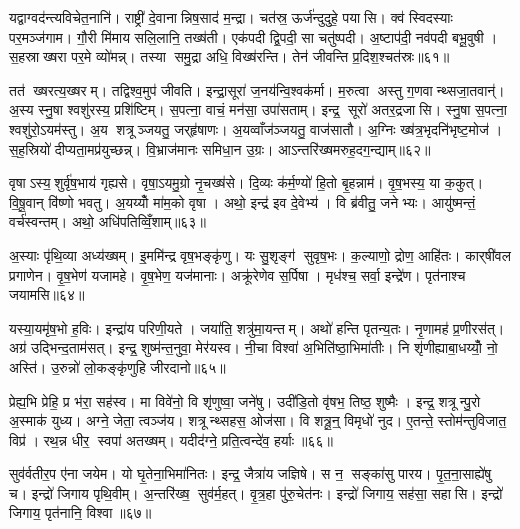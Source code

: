 यद्वाग्वद॑न्त्यविचेत॒नानि॑। राष्ट्री॑ दे॒वानान्निष॒साद॑ म॒न्द्रा। चत॑स्र॒ ऊर्ज॑न्दुदुहे॒ पयासि। क्व॑ स्विदस्याः पर॒मञ्ज॑गाम। गौ॒री मि॑माय सलि॒लानि॒ तख्ष॑ती। एक॑पदी द्वि॒पदी॒ सा चतु॑ष्पदी। अ॒ष्टाप॑दी॒ नव॑पदी बभू॒वुषी। स॒हस्राख्षरा पर॒मे व्यो॑मन्न्। तस्या समु॒द्रा अधि॒ विख्ष॑रन्ति। तेन॑ जीवन्ति प्र॒दिश॒श्चत॑स्रः॥६१॥

तत॑ ख्षरत्य॒ख्षरम्। तद्विश्व॒मुप॑ जीवति। इन्द्रा॒सूरा॑ ज॒नय॑न्वि॒श्वक॑र्मा। म॒रुत्वा अस्तु ग॒णवान्थ्सजा॒तवान्॑। अ॒स्य स्नु॒षा श्वशु॑रस्य॒ प्रशि॑ष्टिम्। स॒पत्ना॒ वाचं॒ मन॑सा॒ उपा॑सताम्। इन्द्र॒ सूरो॑ अतर॒द्रजासि। स्नु॒षा स॒पत्ना॒ श्वशु॑रो॒ऽयम॑स्तु। अ॒य शत्रूञ्जयतु॒ जर्‌हृ॑षाणः। अ॒यव्वाँज॑ञ्जयतु॒ वाज॑सातौ। अ॒ग्निः ख्ष॑त्र॒भृदनि॑भृष्ट॒मोज॑। स॒ह॒स्रियो॑ दीप्यता॒मप्र॑युच्छन्न्। वि॒भ्राज॑मानः समिधा॒न उ॒ग्रः। आऽन्तरि॑ख्षमरुह॒दग॒न्द्याम्॥६२॥\anuvakamend[धा॒रय॑न्पुरो॒डाशं॒ बृह॒स्पति॑ञ्ज॒घन॑च्युतिमान॒न्दो भग॑स्य तृप्याण्य॒ग्नेः पृ॑थि॒वी यज्व॑न एतु प्र॒दिश॒श्चत॑स्रो॒ वाज॑सातौ च॒त्वारि॑ च]

वृषाऽस्य॒शुर्वृ॑ष॒भाय॑ गृह्यसे। वृषा॒ऽयमु॒ग्रो नृ॒चख्ष॑से। दि॒व्यः क॑र्म॒ण्यो॑ हि॒तो बृ॒हन्नाम॑। वृ॒ष॒भस्य॒ या क॒कुत्। वि॒षू॒वान् वि॑ष्णो भवतु। अ॒यय्योँ मा॑म॒को वृषा। अथो॒ इन्द्र॑ इव दे॒वेभ्य॑। वि ब्र॑वीतु॒ जनेभ्यः। आयु॑ष्मन्तं॒ वर्च॑स्वन्तम्। अथो॒ अधि॑पतिव्विँ॒शाम्॥६३॥

अ॒स्याः पृ॑थि॒व्या अध्य॑ख्षम्। इ॒ममि॑न्द्र वृष॒भङ्कृ॑णु। यः सु॒शृङ्ग॑ सुवृष॒भः। क॒ल्याणो॒ द्रोण॒ आहि॑तः। कार्‌षी॑वल प्रगाणेन। वृ॒ष॒भेण॑ यजामहे। वृ॒ष॒भेण॒ यज॑मानाः। अक्रू॑रेणेव स॒र्पिषा। मृध॑श्च॒ सर्वा॒ इन्द्रे॑ण। पृत॑नाश्च जयामसि॥६४॥

यस्या॒यमृ॑ष॒भो ह॒विः। इन्द्रा॑य परिणी॒यते। जया॑ति॒ शत्रु॑मा॒यन्तम्। अथो॑ हन्ति पृतन्य॒तः। नृ॒णामह॑ प्र॒णीरस॑त्। अग्र॑ उद्भिन्द॒ताम॑सत्। इन्द्र॒ शुष्म॑न्त॒नुवा॒ मेर॑यस्व। नी॒चा विश्वा॑ अ॒भिति॑ष्ठा॒भिमा॑तीः। नि शृ॑णीह्याबा॒धय्योँ॒ नो॒ अस्ति॑। उ॒रुन्नो॑ लो॒कङ्कृ॑णुहि जीरदानो॥६५॥

प्रेह्य॒भि प्रेहि॒ प्र भ॑रा॒ सह॑स्व। मा विवे॑नो॒ वि शृ॑णुष्वा॒ जने॑षु। उदी॑डि॒तो वृ॑षभ॒ तिष्ठ॒ शुष्मैः। इन्द्र॒ शत्रून्पु॒रो अ॒स्माक॑ युध्य। अग्ने॒ जेता॒ त्वञ्ज॑य। शत्रून्थ्सहस॒ ओज॑सा। वि शत्रू॒न्॒ विमृधो॑ नुद। ए॒तन्ते॒ स्तोम॑न्तुविजात॒ विप्र॑। रथ॒न्न धीर॒ स्वपा॑ अतख्षम्। यदीद॑ग्ने॒ प्रति॒त्वन्दे॑व॒ हर्याः॥६६॥

सुव॑र्वतीर॒प ए॑ना जयेम। यो घृ॒तेना॒भिमा॑नितः। इन्द्र॒ जैत्रा॑य जज्ञिषे। स न॒ सङ्का॑सु पारय। पृ॒त॒ना॒साह्ये॑षु च। इन्द्रो॑ जिगाय पृथि॒वीम्। अ॒न्तरि॑ख्ष॒ सुव॑र्म॒हत्। वृ॒त्र॒हा पु॑रु॒चेत॑नः। इन्द्रो॑ जिगाय॒ सह॑सा॒ सहासि। इन्द्रो॑ जिगाय॒ पृत॑नानि॒ विश्वा॥६७॥

